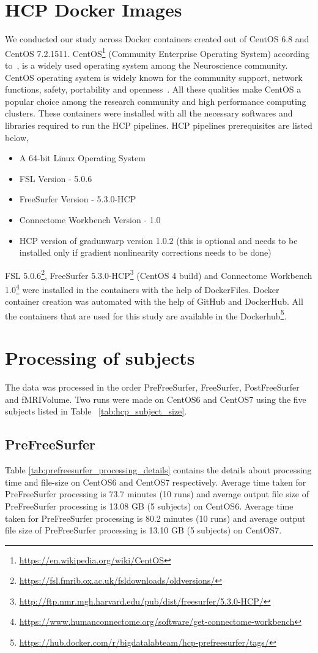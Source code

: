 \section{HCP Docker Images}\label{hcp_docker}
We conducted our study across Docker containers created out of CentOS 6.8 and CentOS 7.2.1511. CentOS\footnote{\url{https://en.wikipedia.org/wiki/CentOS}} (Community Enterprise Operating System) according to~\cite{CentOS}, is a widely used operating system among the Neuroscience community. CentOS operating system is widely known for the community support, network functions, safety, portability and openness~\cite{5665431}. All these qualities make CentOS a popular choice among the research community and high performance computing clusters.
These containers were installed with all the necessary softwares and libraries required to run the HCP pipelines. HCP pipelines prerequisites are listed below,
\begin{itemize}
\item A 64-bit Linux Operating System
\item FSL Version - 5.0.6
\item FreeSurfer Version - 5.3.0-HCP
\item Connectome Workbench Version - 1.0
\item HCP version of gradunwarp version 1.0.2 (this is optional and needs to be installed only if gradient nonlinearity corrections needs to be done)
\end{itemize}
FSL 5.0.6\footnote{\url{https://fsl.fmrib.ox.ac.uk/fsldownloads/oldversions/}}, FreeSurfer 5.3.0-HCP\footnote{\url{http://ftp.nmr.mgh.harvard.edu/pub/dist/freesurfer/5.3.0-HCP/}} (CentOS 4 build) and Connectome Workbench 1.0\footnote{\url{https://www.humanconnectome.org/software/get-connectome-workbench}} were installed in the containers with the help of DockerFiles.
Docker container creation was automated with the help of GitHub and DockerHub. All the containers that are used for this study are available in the Dockerhub\footnote{\url{https://hub.docker.com/r/bigdatalabteam/hcp-prefreesurfer/tags/}}.

\section{Processing of subjects} \label{processing_subjects}
The data was processed in the order PreFreeSurfer, FreeSurfer, PostFreeSurfer and fMRIVolume. Two runs were made on CentOS6 and CentOS7 using the five subjects listed in Table ~\ref{tab:hcp_subject_size}.
\subsection{PreFreeSurfer}
Table \ref{tab:prefreesurfer_processing_details} contains the details about processing time and file-size on CentOS6 and CentOS7 respectively.
Average time taken for PreFreeSurfer processing is 73.7 minutes (10 runs) and average output file size of PreFreeSurfer processing is 13.08 GB (5 subjects) on CentOS6.
Average time taken for PreFreeSurfer processing is 80.2 minutes (10 runs) and average output file size of PreFreeSurfer processing is 13.10 GB (5 subjects) on CentOS7.

